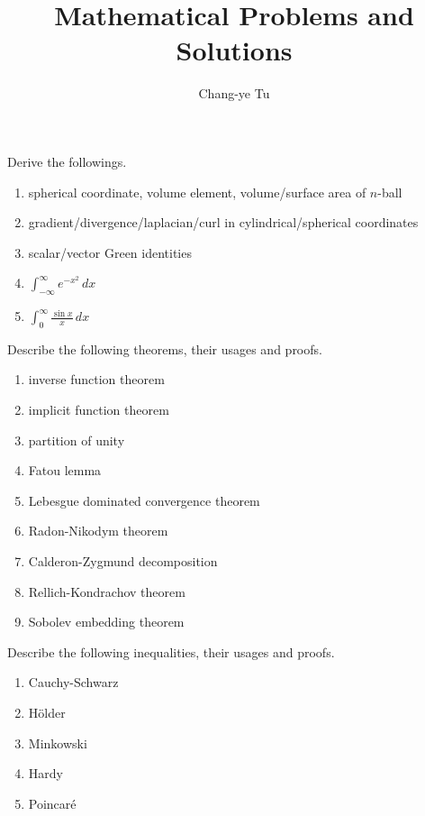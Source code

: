 
\title{Mathematical Problems and Solutions}
\author{Chang-ye Tu}
\maketitle

\begin{prob}
  Derive the followings.
  \begin{enumerate}
    \item spherical coordinate, volume element, volume/surface area of $n$-ball
    \item gradient/divergence/laplacian/curl in cylindrical/spherical coordinates
    \item scalar/vector Green identities 
    \item $\int_{-\infty}^\infty e^{-x^2}\,dx$
    \item $\int_0^\infty \frac{\sin x}{x}\,dx$
  \end{enumerate}
\end{prob}

\begin{prob}[Theorems]
  Describe the following theorems, their usages and proofs.
  \begin{enumerate}
    \item inverse function theorem
    \item implicit function theorem
    \item partition of unity
    \item Fatou lemma
    \item Lebesgue dominated convergence theorem
    \item Radon-Nikodym theorem
    \item Calderon-Zygmund decomposition
    \item Rellich-Kondrachov theorem
    \item Sobolev embedding theorem
  \end{enumerate}
\end{prob}

\begin{prob}[Inequalities]
  Describe the following inequalities, their usages and proofs.
  \begin{enumerate}
    \item Cauchy-Schwarz
    \item H\"older
    \item Minkowski 
    \item Hardy
    \item Poincar\'e
  \end{enumerate}
\end{prob}

